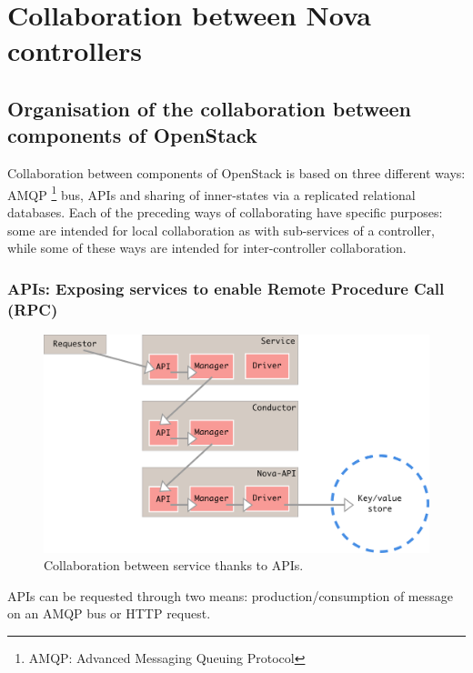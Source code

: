 \chapter{Collaboration between Nova controllers}
\label{sec:collaboration}



\section{Organisation of the collaboration between components of OpenStack}

Collaboration between components of OpenStack is based on three different ways:
AMQP \footnote{AMQP: Advanced Messaging Queuing Protocol} bus, APIs and
sharing of inner-states via a replicated relational databases. Each of the 
preceding ways of collaborating have specific purposes: some are intended for 
local collaboration as with sub-services of a controller, while some of these
ways are intended for inter-controller collaboration.

\subsection{APIs: Exposing services to enable Remote Procedure Call (RPC)}

\begin{figure}[htbp]
        \centering
        \includegraphics[width=14cm]{figures/NovaServices_API.pdf}        
        \caption{Collaboration between service thanks to APIs.}
        \label{fig:sequence_vm_creation}
\vspace*{-.3cm}
\end{figure}




APIs can be requested through two means: production/consumption of message on an
AMQP bus or HTTP request.

